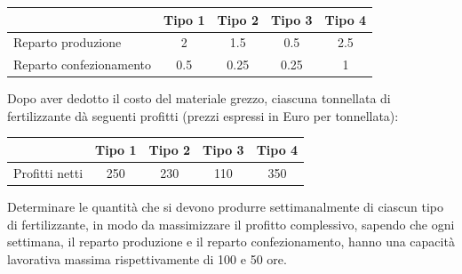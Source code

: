 \documentclass[a4paper]{extarticle}
\renewcommand\arraystretch{}
\begin{document}
\vspace{1em}
\noindent
\begin{table}[H]
    \setlength{\tabcolsep}{8pt}
    \renewcommand{\arraystretch}{1.5}
    \noindent
    \centering
    \begin{tabular}{l|cccc}
        & Tipo 1 & Tipo 2 & Tipo 3 & Tipo 4\\
        \hline
        Reparto produzione      & 2   & 1.5  & 0.5  & 2.5\\
        Reparto confezionamento & 0.5 & 0.25 & 0.25 & 1
    \end{tabular}
\end{table}    

\vspace{1em}
\noindent
Dopo aver  dedotto  il  costo  del  materiale  grezzo,  ciascuna tonnellata  di  fertilizzante  dà  seguenti  profitti (prezzi espressi in Euro per tonnellata):

\vspace{1em}
\noindent
\begin{table}[H]
    \setlength{\tabcolsep}{8pt}
    \renewcommand{\arraystretch}{1.5}
    \noindent
    \centering
    \begin{tabular}{l|cccc}
        & Tipo 1 & Tipo 2 & Tipo 3 & Tipo 4\\
        \hline
        Profitti netti & 250   & 230  & 110  & 350\\
    \end{tabular}
\end{table}    

\vspace{1em}
\noindent
Determinare le quantità che si devono produrre settimanalmente di ciascun tipo di fertilizzante, in modo da massimizzare il profitto complessivo, sapendo che ogni settimana, il reparto produzione e il reparto confezionamento, hanno una capacità lavorativa massima rispettivamente di 100 e 50 ore.
\end{document}
